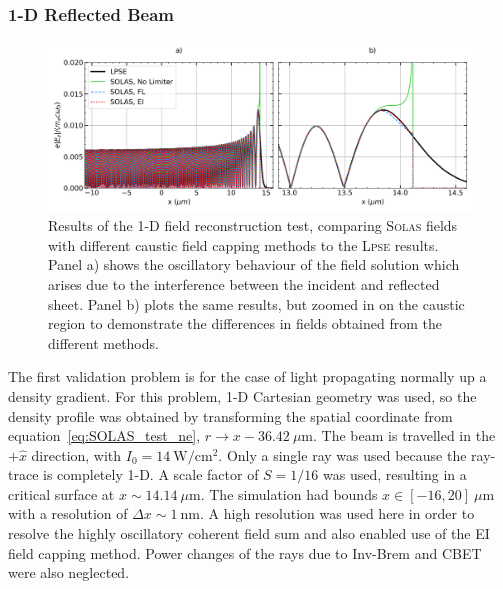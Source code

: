 \subsubsection{1-D Reflected Beam}

\begin{figure}[t!]
    \includegraphics[width=\linewidth]{Numerics/Images/1d_field_capping.png}
    \centering
    \caption{Results of the 1-D field reconstruction test, comparing \textsc{Solas} fields with different caustic field capping methods to the \textsc{Lpse} results.
    Panel a) shows the oscillatory behaviour of the field solution which arises due to the interference between the incident and reflected sheet.
    Panel b) plots the same results, but zoomed in on the caustic region to demonstrate the differences in fields obtained from the different methods.}%
    \label{fig:SOLAS_1d_field_test}
\end{figure}

The first validation problem is for the case of light propagating normally up a density gradient.
For this problem, 1-D Cartesian geometry was used, so the density profile was obtained by transforming the spatial coordinate from equation~\ref{eq:SOLAS_test_ne}, $r\rightarrow x-36.42\ \mu\text{m}$.
The beam is travelled in the $+\hat{x}$ direction, with $I_0 = 14\ \text{W}/\text{cm}^{2}$.
Only a single ray was used because the ray-trace is completely 1-D.
A scale factor of $S=1/16$ was used, resulting in a critical surface at $x\sim 14.14\ \mu\text{m}$.
The simulation had bounds $x\in [-16,20]\ \mu\text{m}$ with a resolution of $\Delta x\sim 1\ \text{nm}$.
A high resolution was used here in order to resolve the highly oscillatory coherent field sum and also enabled use of the \ac{EI} field capping method.
Power changes of the rays due to \ac{Inv-Brem} and \ac{CBET} were also neglected.

